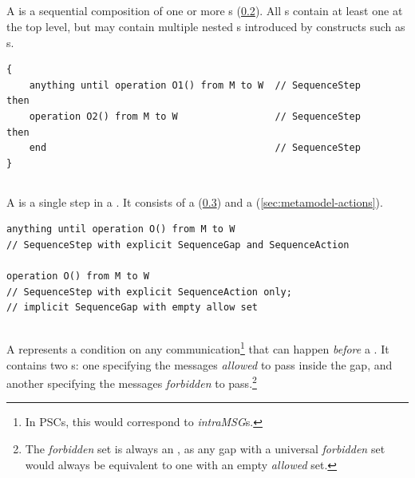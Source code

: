 \subsection{\msubsequence}\label{ssec:metamodel-sequences-subsequences}

A \msubsequence{} is a sequential composition of one or more \msequencestep s
(\cref{ssec:metamodel-sequences-steps}).
All \msequence s contain at least one \msubsequence{} at the top level, but
may contain multiple nested \msubsequence s introduced by constructs such as
\mloopaction s.

\begin{lstlisting}[style=Example]
{
    anything until operation O1() from M to W  // SequenceStep
then
    operation O2() from M to W                 // SequenceStep
then
    end                                        // SequenceStep
}
\end{lstlisting}

\subsection{\msequencestep}\label{ssec:metamodel-sequences-steps}

A \msequencestep{} is a single step in a \msubsequence.  It consists of a
\msequencegap{} (\cref{ssec:metamodel-sequences-gaps}) and a
\msequenceaction{} (\cref{sec:metamodel-actions}).

\begin{lstlisting}[style=Example]
anything until operation O() from M to W
// SequenceStep with explicit SequenceGap and SequenceAction

operation O() from M to W
// SequenceStep with explicit SequenceAction only;
// implicit SequenceGap with empty allow set
\end{lstlisting}

\subsection{\msequencegap}\label{ssec:metamodel-sequences-gaps}

A \msequencegap{} represents a condition on any communication\footnote{In PSCs,
this would correspond to \emph{intraMSG}s.} that can happen
\emph{before} a \msequenceaction.  
It contains two \mgapmessageset s: one specifying the messages
\emph{allowed} to pass inside the gap, and another specifying the messages
\emph{forbidden} to pass.\footnote{The \emph{forbidden} set is always an
\mextensionalgapmessageset, as any gap with a universal
\emph{forbidden} set would always be equivalent to one with an empty
\emph{allowed} set.
}

